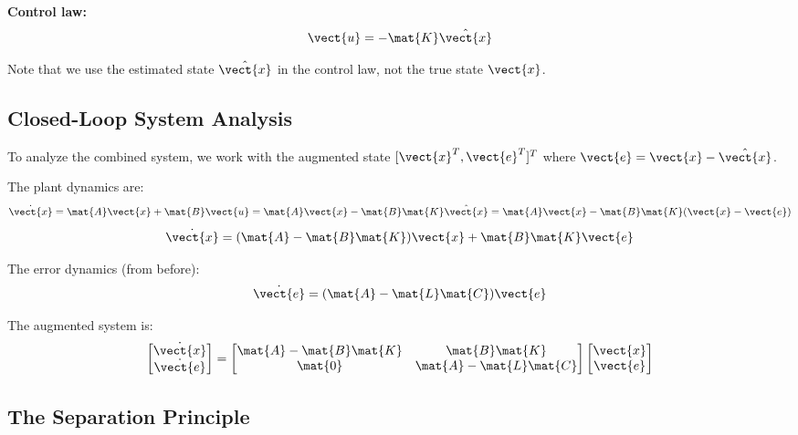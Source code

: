 \textbf{Control law:}
\begin{equation}
\vect{u} = -\mat{K}\hat{\vect{x}}
\label{eq:control_law_observer}
\end{equation}

Note that we use the estimated state $\hat{\vect{x}}$ in the control law, not the true state $\vect{x}$.

\subsection{Closed-Loop System Analysis}

To analyze the combined system, we work with the augmented state $[\vect{x}^T, \vect{e}^T]^T$ where $\vect{e} = \vect{x} - \hat{\vect{x}}$.

The plant dynamics are:
\begin{equation}
\dot{\vect{x}} = \mat{A}\vect{x} + \mat{B}\vect{u} = \mat{A}\vect{x} - \mat{B}\mat{K}\hat{\vect{x}} = \mat{A}\vect{x} - \mat{B}\mat{K}(\vect{x} - \vect{e})
\end{equation}
\begin{equation}
\dot{\vect{x}} = (\mat{A} - \mat{B}\mat{K})\vect{x} + \mat{B}\mat{K}\vect{e}
\label{eq:plant_augmented}
\end{equation}

The error dynamics (from before):
\begin{equation}
\dot{\vect{e}} = (\mat{A} - \mat{L}\mat{C})\vect{e}
\label{eq:error_augmented}
\end{equation}

The augmented system is:
\begin{equation}
\begin{bmatrix} \dot{\vect{x}} \\ \dot{\vect{e}} \end{bmatrix} =
\begin{bmatrix}
\mat{A} - \mat{B}\mat{K} & \mat{B}\mat{K} \\
\mat{0} & \mat{A} - \mat{L}\mat{C}
\end{bmatrix}
\begin{bmatrix} \vect{x} \\ \vect{e} \end{bmatrix}
\label{eq:augmented_system}
\end{equation}

\subsection{The Separation Principle}


